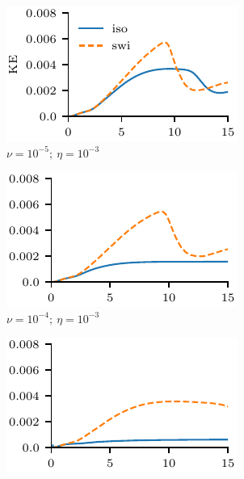 \begin{figure}[t]
  \centering
    \begin{subfigure}{0.32\textwidth}
      \centering
      \includegraphics[width=1.0\linewidth]{param_study/v-5r-3_kinetic_energy.pdf}
      \caption{$\nu = 10^{-5};\ \eta = 10^{-3}$}%
      \label{fig:v-5r-3_kinetic_energy_ps}
    \end{subfigure}
    \hfill
    \begin{subfigure}{0.32\textwidth}
      \centering
      \includegraphics[width=1.0\linewidth]{param_study/v-4r-3_kinetic_energy.pdf}
      \caption{$\nu = 10^{-4};\ \eta = 10^{-3}$}%
      \label{fig:v-4r-3_kinetic_energy_ps}
    \end{subfigure}
    \hfill
    \begin{subfigure}{0.32\textwidth}
      \centering
      \includegraphics[width=1.0\linewidth]{param_study/v-3r-3_kinetic_energy.pdf}

\end{subfigure}
\end{figure}
